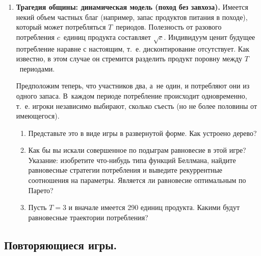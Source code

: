 \documentclass[a4paper,12pt]{article}
\begin{document}
\begin{enumerate}

\item{\bf Трагедия общины: динамическая модель (поход без
завхоза).} Имеется некий объем частных благ (например,
запас продуктов питания в походе), который может
потребляться $T$~периодов. Полезность от разового
потребления $c$~единиц продукта составляет $\sqrt{c}$.
Индивидуум ценит будущее потребление наравне с настоящим,
т.~е. дисконтирование отсутствует. Как известно, в этом
случае он стремится разделить продукт поровну между
$T$~периодами.

Предположим теперь, что участников два, а~не один, и
потребляют они из одного запаса. В~каждом периоде
потребление происходит одновременно, т.~е. игроки
независимо выбирают, сколько съесть (но не более половины
от имеющегося).

\begin{enumerate}

\item Представьте это в виде игры в развернутой форме. Как
устроено дерево?

\item Как бы вы искали совершенное по подыграм равновесие в
этой игре? Указание: изобретите что-нибудь типа функций
Беллмана, найдите равновесные стратегии потребления и
выведите рекуррентные соотношения на параметры. Является ли
равновесие оптимальным по Парето?

\item Пусть $T=3$ и вначале имеется 290 единиц продукта.
Какими будут равновесные траектории потребления?

\end{enumerate}

\end{enumerate}

\subsection{Повторяющиеся игры.}
\end{document}
